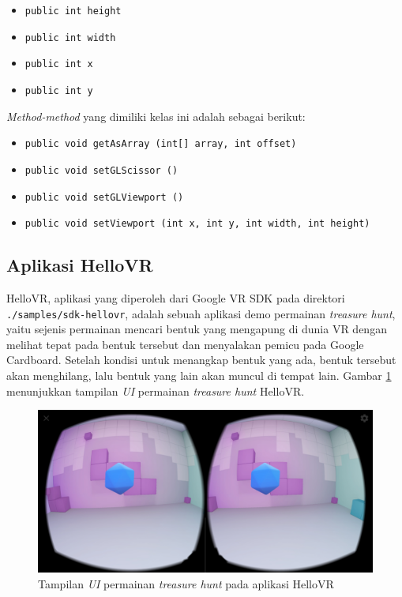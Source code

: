 \begin{enumerate}
		\begin{itemize}
			\item \texttt{public int height}
			
			\item \texttt{public int width}
			
			\item \texttt{public int x}
			
			\item \texttt{public int y}
		\end{itemize}
			
		\textit{Method-method} yang dimiliki kelas ini adalah sebagai berikut:
		
		\begin{itemize}
			\item \texttt{public void getAsArray (int[] array, int offset)}
			
			\item \texttt{public void setGLScissor ()}
			
			\item \texttt{public void setGLViewport ()}
			
			\item \texttt{public void setViewport (int x, int y, int width, int height)}
		\end{itemize}
	\end{enumerate}

\subsection{Aplikasi HelloVR}
\label{subs:hello-vr}
HelloVR, aplikasi yang diperoleh dari Google VR SDK pada direktori \texttt{./samples/sdk-hellovr}, adalah sebuah aplikasi demo permainan \textit{treasure hunt}, yaitu sejenis permainan mencari bentuk yang mengapung di dunia VR dengan melihat tepat pada bentuk tersebut dan menyalakan pemicu pada Google Cardboard. Setelah kondisi untuk menangkap bentuk yang ada, bentuk tersebut akan menghilang, lalu bentuk yang lain akan muncul di tempat lain. Gambar \ref{fig:treasure-hunt} menunjukkan tampilan \textit{UI} permainan \textit{treasure hunt} HelloVR. 

\begin{figure}[h]
	\centering
		\includegraphics[width=6in]{Gambar/treasure_hunt.jpg}
	\caption{Tampilan \textit{UI} permainan \textit{treasure hunt} pada aplikasi HelloVR}
	\label{fig:treasure-hunt}
\end{figure}

